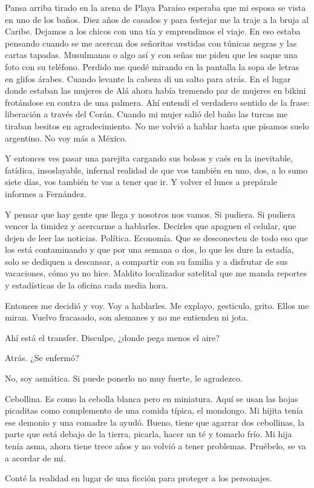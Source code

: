 \documentclass[11pt,twoside,openright,a6paper]{book}
\begin{document}
\vspace{1.5cm}
Pansa arriba tirado en la arena de Playa Paraíso esperaba que mi esposa se vista en uno de los baños. Diez años de casados y para festejar me la traje a la bruja al Caribe. Dejamos a los chicos con una tía y emprendimos el viaje. En eso estaba pensando cuando se me acercan dos señoritas vestidas con túnicas negras y las cartas tapadas. Musulmanas o algo así y con señas me piden que les saque una foto con su teléfono. Perdido me quedé mirando en la pantalla la sopa de letras en glifos árabes. Cuando levante la cabeza di un salto para atrás. En el lugar donde estaban las mujeres de Alá ahora había tremendo par de mujeres en bikini frotándose en contra de una palmera. Ahí entendí el verdadero sentido de la frase: liberación a través del Corán. Cuando mi mujer salió del baño las turcas me tiraban besitos en agradecimiento. No me volvió a hablar hasta que pisamos suelo argentino. No voy más a México.


\vspace{1.5cm}
Y entonces ves pasar una parejita cargando sus bolsos y caés en la inevitable, fatídica, insoslayable, infernal realidad de que vos también en uno, dos, a lo sumo siete días, vos también te vas a tener que ir. Y volver el lunes a prepárale informes a Fernández.


\vspace{1.5cm}
Y pensar que hay gente que llega y nosotros nos vamos. Si pudiera. Si pudiera vencer la timidez y acercarme a hablarles. Decirles que apaguen el celular, que dejen de leer las noticias. Política. Economía. Que se desconecten de todo eso que los está contaminando y que por una semana o dos, lo que les dure la estadía, solo se dediquen a descansar, a compartir con su familia y a disfrutar de sus vacaciones, cómo yo no hice. Maldito localizador satelital que me manda reportes y estadísticas de la oficina cada media hora. 

Entonces me decidió y voy. Voy a hablarles. Me explayo, gesticulo, grito. Ellos me miran. Vuelvo fracasado, son alemanes y no me entienden ni jota.


\vspace{1.5cm}
Ahí está el transfer. Disculpe, ¿donde pega menos el aire?

Atrás. ¿Se enfermó?

No, soy asmática. Si puede ponerlo no muy fuerte, le agradezco.

Cebollina. Es como la cebolla blanca pero en miniatura. Aquí se usan las hojas picaditas como complemento de una comida típica, el mondongo. Mi hijita tenía ese demonio y una comadre la ayudó. Bueno, tiene que agarrar dos cebollinas, la parte que está debajo de la tierra, picarla, hacer un té y tomarlo frío. Mi hija tenía asma, ahora tiene trece años y no volvió a tener problemas. Pruébelo, se va a acordar de mí.


\vspace{1.5cm}
Conté la realidad en lugar de una ficción para proteger a los personajes.
\end{document}
